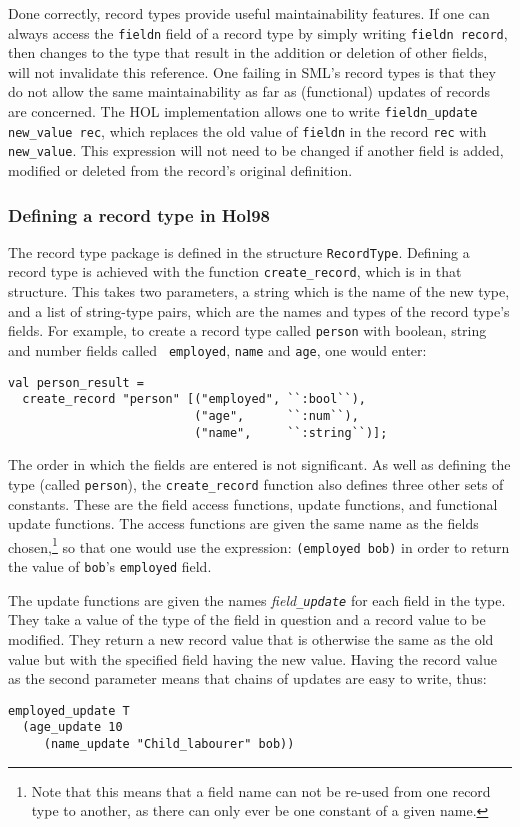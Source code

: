 \documentclass[12pt,fleqn,a4paper]{report}
\begin{document}
Done correctly, record types provide useful maintainability features.
If one can always access the {\tt fieldn} field of a record type by
simply writing {\tt fieldn record}, then changes to the type that
result in the addition or deletion of other fields, will not
invalidate this reference.  One failing in SML's record types is that
they do not allow the same maintainability as far as (functional)
updates of records are concerned.  The HOL implementation allows one
to write {\tt fieldn\_update new\_value rec}, which replaces the old
value of {\tt fieldn} in the record {\tt rec} with {\tt new\_value}.
This expression will not need to be changed if another field is added,
modified or deleted from the record's original definition.

\subsubsection{Defining a record type in Hol98}

\newcommand{\createrec}{{\tt create\_record}} The record type package
is defined in the structure {\tt RecordType}.  Defining a record type
is achieved with the function \createrec, which is in that structure.
This takes two parameters, a string which is the name of the new type,
and a list of string-type pairs, which are the names and types of the
record type's fields.  For example, to create a record type called
{\tt person} with boolean, string and number fields called {\tt
  employed}, {\tt name} and {\tt age}, one would enter:
\begin{verbatim}
val person_result =
  create_record "person" [("employed", ``:bool``),
                          ("age",      ``:num``),
                          ("name",     ``:string``)];
\end{verbatim}
The order in which the fields are entered is not significant. As well as
defining the type (called {\tt person}), the \createrec{} function also
defines three other sets of constants.  These are the field access
functions, update functions, and functional update functions.  The
access functions are given the same name as the fields
chosen,\footnote{Note that this means that a field name can not be
re-used from one record type to another, as there can only ever be one
constant of a given name.} so that one would use the expression:
\mbox{\tt (employed bob)} in order to return the value of {\tt bob}'s
{\tt employed} field.

The update functions are given the names {\it field\tt\_update} for
each field in the type.  They take a value of the type of the field in
question and a record value to be modified.  They return a new record
value that is otherwise the same as the old value but with the
specified field having the new value.  Having the record value as the
second parameter means that chains of updates are easy to write, thus:
\begin{verbatim}
employed_update T
  (age_update 10
     (name_update "Child_labourer" bob))
\end{verbatim}
\end{document}

